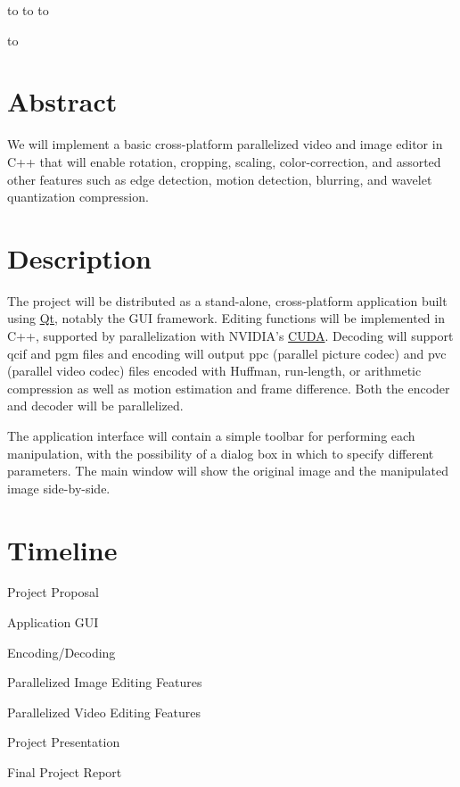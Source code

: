 \documentclass[12pt]{article}
\newcommand{\hpsheader}[1]{
   \noindent      
   \hbox to \textwidth {\hfill H. Parker Shelton}
   \vspace{0mm}
   \hbox to \textwidth {\hfill Adam Feinstein}
   \vspace{0mm}
   \hbox to \textwidth {\hfill \today}
   \vspace{0mm}
   \begin{center}
       \hbox to \textwidth {{\Large \hfill #1 \hfill} }
   \end{center}
}
\begin{document}
\hpsheader{Final Project Proposal}

\section{Abstract}
We will implement a basic cross-platform parallelized video and image editor in C++ that will enable rotation, cropping, scaling, color-correction, and assorted other features such as edge detection, motion detection, blurring, and wavelet quantization compression.

\section{Description}
The project will be distributed as a stand-alone, cross-platform application built using \href{http://qt.nokia.com/}{Qt}, notably the GUI framework. Editing functions will be implemented in C++, supported by parallelization with NVIDIA's \href{http://www.nvidia.com/object/cuda_home_new.html}{CUDA}. Decoding will support qcif and pgm files and encoding will output ppc (parallel picture codec) and pvc (parallel video codec)  files encoded with Huffman, run-length, or arithmetic compression as well as motion estimation and frame difference. Both the encoder and decoder will be parallelized.

The application interface will contain a simple toolbar for performing each manipulation, with the possibility of a dialog box in which to specify different parameters. The main window will show the original image and the manipulated image side-by-side.

\section{Timeline}

\begin{description}
\setlength{\labelsep}{25pt}

\item[Mar 24] Project Proposal
\item[Mar 31] Application GUI
\item[Apr 07] Encoding/Decoding
\item[Apr 21] Parallelized Image Editing Features
\item[Apr 28] Parallelized Video Editing Features
\item[May 05] Project Presentation
\item[May 12] Final Project Report

\end{description}
\end{document}
